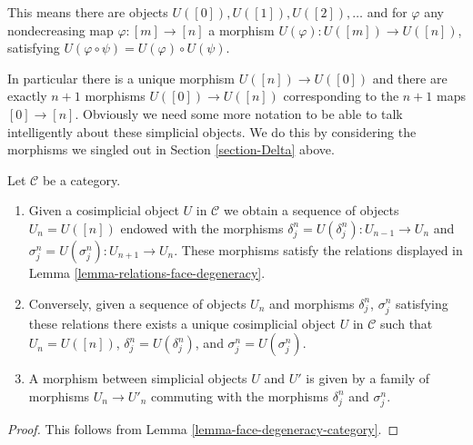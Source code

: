 \noindent
This means there are objects $U([0]), U([1]), U([2]), \ldots$
and for $\varphi$ any nondecreasing map $\varphi : [m] \to [n]$
a morphism $U(\varphi) : U([m]) \to U([n])$, satisfying
$U(\varphi \circ \psi) = U(\varphi) \circ U(\psi)$.

\medskip\noindent
In particular there is a unique morphism $U([n]) \to U([0])$ and there are
exactly $n + 1$ morphisms $U([0]) \to U([n])$ corresponding to
the $n + 1$ maps $[0] \to [n]$. Obviously we need some more notation
to be able to talk intelligently about these simplicial objects.
We do this by considering the morphisms we singled out in
Section \ref{section-Delta} above.

\begin{lemma}
\label{lemma-characterize-cosimplicial-object}
Let $\mathcal{C}$ be a category.
\begin{enumerate}
\item Given a cosimplicial object $U$ in $\mathcal{C}$
we obtain a sequence of objects $U_n = U([n])$ endowed
with the morphisms $\delta^n_j = U(\delta^n_j) : U_{n - 1} \to U_n$ and
$\sigma^n_j = U(\sigma^n_j) : U_{n + 1} \to U_n$. These morphisms
satisfy the relations displayed in
Lemma \ref{lemma-relations-face-degeneracy}.
\item Conversely, given a sequence of objects $U_n$ and morphisms
$\delta^n_j$, $\sigma^n_j$ satisfying these relations there exists a unique
cosimplicial object $U$ in $\mathcal{C}$ such that $U_n = U([n])$,
$\delta^n_j = U(\delta^n_j)$, and $\sigma^n_j = U(\sigma^n_j)$.
\item A morphism between simplicial objects $U$ and $U'$
is given by a family of morphisms $U_n \to U'_n$ commuting
with the morphisms $\delta^n_j$ and $\sigma^n_j$.
\end{enumerate}
\end{lemma}

\begin{proof}
This follows from Lemma \ref{lemma-face-degeneracy-category}.
\end{proof}

